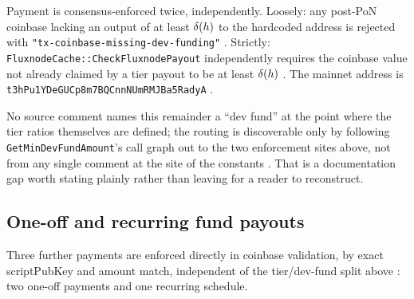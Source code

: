 Payment is consensus-enforced twice, independently. Loosely: any post-PoN coinbase lacking an
output of at least $\delta(h)$ to the hardcoded address is rejected with
\texttt{"tx-\allowbreak{}coinbase-\allowbreak{}missing-\allowbreak{}dev-\allowbreak{}funding"} \shipped {}.
Strictly: \texttt{Fluxnode\allowbreak{}Cache::\allowbreak{}Check\allowbreak{}Fluxnode\allowbreak{}Payout} independently requires the coinbase value not
already claimed by a tier payout to be at least $\delta(h)$
\shipped {}. The mainnet address is
\texttt{t3h\allowbreak{}Pu1YDe\allowbreak{}GUCp8m7BQCnn\allowbreak{}NUm\allowbreak{}RMJBa5Rady\allowbreak{}A} \shipped {}.

No source comment names this remainder a ``dev fund'' at the point where the tier ratios
themselves are defined; the routing is discoverable only by following
\texttt{Get\allowbreak{}Min\allowbreak{}Dev\allowbreak{}Fund\allowbreak{}Amount}'s call graph out to the two enforcement sites above, not from any
single comment at the site of the constants \shipped {}. That
is a documentation gap worth stating plainly rather than leaving for a reader to reconstruct.

\subsection{One-off and recurring fund payouts}
\label{sec:mp-fund-payouts}

Three further payments are enforced directly in coinbase validation, by exact scriptPubKey and
amount match, independent of the tier/dev-fund split above
\shipped {}: two one-off payments and one recurring schedule.

